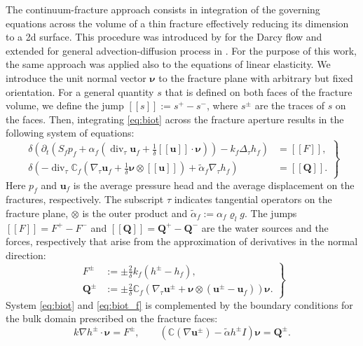 \documentclass{article}
\newcommand{\CC}{\mathbb C}
\renewcommand{\div}{\operatorname{div}}
\newcommand{\eq}[1]{\begin{equation}#1\end{equation}}
\newcommand{\jmp}[1]{[\![#1]\!]}
\newcommand{\uu}{\vc u}
\newcommand{\vc}[1]{\boldsymbol{#1}}
\begin{document}
The continuum-fracture approach consists in integration of the governing equations across the volume of a thin fracture effectively reducing its dimension to a 2d surface. This procedure was introduced by \cite{martin_modeling_2005} for the Darcy flow and extended for general advection-diffusion process in \cite{brezina_analysis_2015}. For the purpose of this work, the same approach was applied also to the equations of linear elasticity. We introduce the unit normal vector $\vc\nu$ to the fracture plane with arbitrary but fixed orientation.
For a general quantity $s$ that is defined on both faces of the fracture volume, we define the jump $\jmp{s}:=s^+-s^-$, where $s^\pm$ are the traces of $s$ on the faces. 
Then, integrating \eqref{eq:biot} across the fracture aperture results in the following system of equations:
\eq{\label{eq:biot_f}\left.\begin{aligned}
\delta\left(\partial_t\left(S_fp_f + \alpha_f\left(\div_\tau\uu_f+\tfrac1\delta\jmp{\uu}\cdot\vc\nu\right)\right) - k_f\Delta_\tau h_f\right) &= \jmp{F}, \\
\delta\left(-\div_\tau\CC_f(\nabla_\tau\uu_f+\tfrac1\delta\vc\nu\otimes\jmp{\uu}) + \tilde\alpha_f\nabla_\tau h_f\right) &= \jmp{\vc Q}.
\end{aligned}\right\} }
Here $p_f$ and $\uu_f$ is the average pressure head and the average displacement on the fractures, respectively. The subscript $\tau$ indicates tangential operators on the fracture plane, $\otimes$ is the outer product and $\tilde\alpha_f:=\alpha_f\varrho_l g$.
The jumps $\jmp{F}=F^+-F^-$ and $\jmp{\vc Q}=\vc Q^+-\vc Q^-$ are the water sources and the forces, respectively that arise from the approximation of derivatives in the normal direction:
\eq{ 
\label{eq:fr_coupling}
\left.\begin{aligned}
F^\pm &:= \pm\frac2\delta k_f(h^\pm-h_f),\\
\vc Q^\pm &:= \pm\frac2\delta\CC_f(\nabla_\tau\uu^\pm + \vc\nu\otimes(\uu^\pm-\uu_f))\vc\nu. %
\end{aligned}\right\} 
}
System \eqref{eq:biot} and \eqref{eq:biot_f} is complemented by the boundary conditions for the bulk domain prescribed on the fracture faces:
\eq{ 
\label{eq:fr_coupling_bulk}
k\nabla h^\pm\cdot\vc\nu = F^\pm,\qquad \left(\CC(\nabla\uu^\pm) - \tilde\alpha h^\pm I\right)\vc\nu = \vc Q^\pm. 
}
\end{document}
